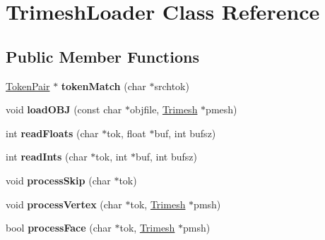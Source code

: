 \hypertarget{classTrimeshLoader}{\section{Trimesh\-Loader Class Reference}
\label{classTrimeshLoader}
}
\subsection*{Public Member Functions}
\begin{DoxyCompactItemize}
\item 
\hypertarget{classTrimeshLoader_a00499ce6cb6cd4f9f57d62ebabf23b22}{\hyperlink{structTokenPair}{Token\-Pair} $\ast$ {\bfseries token\-Match} (char $\ast$srchtok)}\label{classTrimeshLoader_a00499ce6cb6cd4f9f57d62ebabf23b22}

\item 
\hypertarget{classTrimeshLoader_a28a863ff38d4b4c6760efd42d9df86b2}{void {\bfseries load\-O\-B\-J} (const char $\ast$objfile, \hyperlink{classTrimesh}{Trimesh} $\ast$pmesh)}\label{classTrimeshLoader_a28a863ff38d4b4c6760efd42d9df86b2}

\item 
\hypertarget{classTrimeshLoader_a0da06aba10239fca53a38b44ea8b9a02}{int {\bfseries read\-Floats} (char $\ast$tok, float $\ast$buf, int bufsz)}\label{classTrimeshLoader_a0da06aba10239fca53a38b44ea8b9a02}

\item 
\hypertarget{classTrimeshLoader_a8e0ecbde14c2bb56824cf58dd4145168}{int {\bfseries read\-Ints} (char $\ast$tok, int $\ast$buf, int bufsz)}\label{classTrimeshLoader_a8e0ecbde14c2bb56824cf58dd4145168}

\item 
\hypertarget{classTrimeshLoader_a4af576992a8daadfa5122a94832ab6cd}{void {\bfseries process\-Skip} (char $\ast$tok)}\label{classTrimeshLoader_a4af576992a8daadfa5122a94832ab6cd}

\item 
\hypertarget{classTrimeshLoader_ad3b0d9cb78d5e9bc2c1b7deb0854da03}{void {\bfseries process\-Vertex} (char $\ast$tok, \hyperlink{classTrimesh}{Trimesh} $\ast$pmsh)}\label{classTrimeshLoader_ad3b0d9cb78d5e9bc2c1b7deb0854da03}

\item 
\hypertarget{classTrimeshLoader_a43b17b012e2a53f3ee21efb079ae9a01}{bool {\bfseries process\-Face} (char $\ast$tok, \hyperlink{classTrimesh}{Trimesh} $\ast$pmsh)}\label{classTrimeshLoader_a43b17b012e2a53f3ee21efb079ae9a01}

\end{DoxyCompactItemize}
